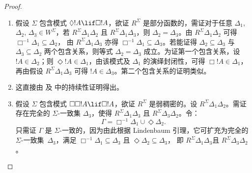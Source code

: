 \documentclass[../../../include/open-logic-section]{subfiles}
\begin{document}
\begin{proof}
  \begin{enumerate}
  \item 假设 $\Sigma$ 包含模式 $\Diamond !A \lif
    \Box !A$，欲证 $R^\Sigma$ 是部分函数的，需证对于任意 $\Delta_1$, $\Delta_2$, $\Delta_3 \in
    W^\Sigma$，若 $R^\Sigma \Delta_1\Delta_2$ 且 $R^\Sigma
    \Delta_1\Delta_3$，则 $\Delta_2=\Delta_3$。由 $R^\Sigma
    \Delta_1\Delta_2$ 可得 $\Box^{-1}\Delta_1 \subseteq \Delta_2$，
    由 $R^\Sigma \Delta_1\Delta_3$ 亦得 $\Box^{-1}\Delta_1
    \subseteq \Delta_3$。若能证得 $\Delta_2 \subseteq \Delta_3$ 与 $\Delta_3 \subseteq
    \Delta_2$ 两个包含关系，则等式 $\Delta_2=\Delta_3$ 成立。为证第一个包含关系，设 $!A \in \Delta_2$；则
    $\Diamond!A \in \Delta_1$，由该模式及 $\Delta_1$ 的演绎封闭性，可得 $\Box!A \in \Delta_1$，再由假设 $R^\Sigma \Delta_1\Delta_3$ 可得 $!A \in \Delta_3$。第二个包含关系的证明类似。

  \item 这直接由  及  中的持续性证明得出。

  \item 假设 $\Sigma$ 包含模式 $\Box\Box!A \lif \Box!A$，欲证 $R^\Sigma$ 是弱稠密的。设 $R^\Sigma
    \Delta_1\Delta_2$。需证存在完全的 $\Sigma$-一致集 $\Delta_3$，使得 $R^\Sigma
    \Delta_1\Delta_3$ 且 $R^\Sigma \Delta_3\Delta_2$。令：
    \[
    \Gamma = \Box^{-1}\Delta_1 \cup \Diamond\Delta_2.
    \]
    只需证 $\Gamma$ 是 $\Sigma$-一致的，因为由此根据 Lindenbaum 引理，它可扩充为完全的
    $\Sigma$-一致集~$\Delta_3$，满足 $\Box^{-1}\Delta_1
    \subseteq \Delta_3$ 且 $\Diamond\Delta_2 \subseteq \Delta_3$，
    即 $R^\Sigma \Delta_1\Delta_3$且 $R^\Sigma
    \Delta_3\Delta_2$。


\end{enumerate}
\end{proof}
\end{document}
